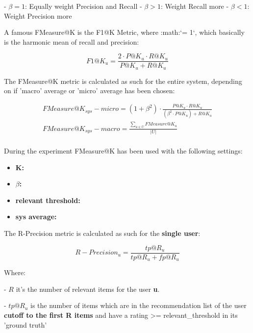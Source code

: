         - $\beta = 1$: Equally weight Precision and Recall
        - $\beta > 1$: Weight Recall more
        - $\beta < 1$: Weight Precision more

\hfill\break

A famous FMeasure@K is the F1@K Metric, where :math:`\beta = 1`, which basically is the harmonic mean of recall and
precision:

    \[
    F1@K_u = \frac{2 \cdot P@K_u \cdot R@K_u}{P@K_u + R@K_u}
    \]

\hfill\break

The FMeasure@K metric is calculated as such for the entire system, depending on if 'macro' average or 'micro'
average has been chosen:

    \begin{gather*}
        FMeasure@K_{sys} - micro = (1 + \beta^2) \cdot \frac{P@K_u \cdot R@K_u}{(\beta^2 \cdot P@K_u) + R@K_u}\\
        FMeasure@K_{sys} - macro = \frac{\sum_{u \in U} FMeasure@K_u}{|U|}\\
    \end{gather*}

\hfill\break

During the experiment FMeasure@K has been used with the following settings:
\begin{itemize}
    \item \textbf{K: }
    \item  \textbf{$\beta$: }
    \item \textbf{relevant threshold:  }
    \item \textbf{sys average:  }
\end{itemize}


The R-Precision metric is calculated as such for the \textbf{single user}:

    \[
    R-Precision_u = \frac{tp@R_u}{tp@R_u + fp@R_u}
    \]

    Where:

    - $R$ it's the number of relevant items for the user \textbf{u}.

    - $tp@R_u$ is the number of items which are in the recommendation list of the user
      \textbf{cutoff to the first R items} and have a rating >= relevant_threshold in its 'ground truth'

